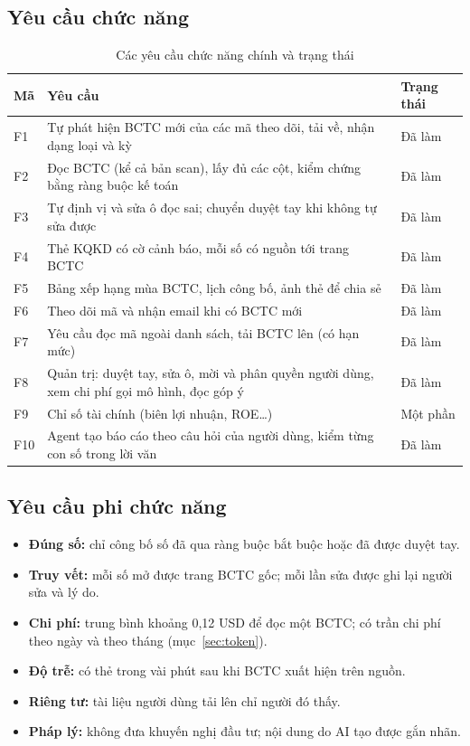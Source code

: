 \documentclass[12pt,a4paper]{report}
\begin{document}
\subsection{Yêu cầu chức năng}
\begin{table}[H]
\centering\small
\caption{Các yêu cầu chức năng chính và trạng thái}\label{tab:ycchucnang}
\begin{tabularx}{\linewidth}{@{}lXl@{}}
\toprule
\textbf{Mã} & \textbf{Yêu cầu} & \textbf{Trạng thái} \\ \midrule
F1 & Tự phát hiện BCTC mới của các mã theo dõi, tải về, nhận dạng loại và kỳ & Đã làm \\
F2 & Đọc BCTC (kể cả bản scan), lấy đủ các cột, kiểm chứng bằng ràng buộc kế toán & Đã làm \\
F3 & Tự định vị và sửa ô đọc sai; chuyển duyệt tay khi không tự sửa được & Đã làm \\
F4 & Thẻ KQKD có cờ cảnh báo, mỗi số có nguồn tới trang BCTC & Đã làm \\
F5 & Bảng xếp hạng mùa BCTC, lịch công bố, ảnh thẻ để chia sẻ & Đã làm \\
F6 & Theo dõi mã và nhận email khi có BCTC mới & Đã làm \\
F7 & Yêu cầu đọc mã ngoài danh sách, tải BCTC lên (có hạn mức) & Đã làm \\
F8 & Quản trị: duyệt tay, sửa ô, mời và phân quyền người dùng, xem chi phí gọi mô hình, đọc góp ý & Đã làm \\
F9 & Chỉ số tài chính (biên lợi nhuận, ROE\ldots) & Một phần \\
F10 & Agent tạo báo cáo theo câu hỏi của người dùng, kiểm từng con số trong lời văn & Đã làm \\
\bottomrule
\end{tabularx}
\end{table}

\subsection{Yêu cầu phi chức năng}
\begin{itemize}
  \item \textbf{Đúng số:} chỉ công bố số đã qua ràng buộc bắt buộc hoặc đã được duyệt tay.
  \item \textbf{Truy vết:} mỗi số mở được trang BCTC gốc; mỗi lần sửa được ghi lại người sửa và lý do.
  \item \textbf{Chi phí:} trung bình khoảng 0,12 USD để đọc một BCTC; có trần chi phí theo ngày và theo tháng (mục~\ref{sec:token}).
  \item \textbf{Độ trễ:} có thẻ trong vài phút sau khi BCTC xuất hiện trên nguồn.
  \item \textbf{Riêng tư:} tài liệu người dùng tải lên chỉ người đó thấy.
  \item \textbf{Pháp lý:} không đưa khuyến nghị đầu tư; nội dung do AI tạo được gắn nhãn.
\end{itemize}
\end{document}
